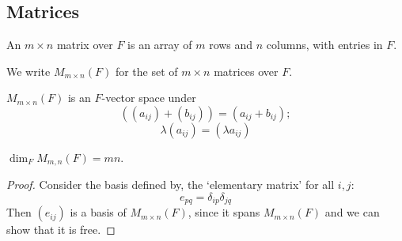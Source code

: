\subsection{Matrices}
\begin{definition}
	An \( m \times n \) matrix over \( F \) is an array of \( m \) rows and \( n \) columns, with entries in \( F \).
\end{definition}
We write \( M_{m \times n}(F) \) for the set of \( m \times n \) matrices over \( F \).
\begin{proposition}
	\( M_{m \times n}(F) \) is an \( F \)-vector space under
	\[
		((a_{ij}) + (b_{ij})) = (a_{ij} + b_{ij});
	\]
	\[
		\lambda (a_{ij}) = (\lambda a_{ij})
	\]
\end{proposition}
\begin{proposition}
	\( \dim_F M_{m,n}(F) = m n \).
\end{proposition}
\begin{proof}
	Consider the basis defined by, the `elementary matrix' for all \( i,j \):
	\[
		e_{pq} = \delta_{ip}\delta_{jq}
	\]
	Then \( (e_{ij}) \) is a basis of \( M_{m \times n}(F) \), since it spans \( M_{m \times n}(F) \) and we can show that it is free.
\end{proof}

